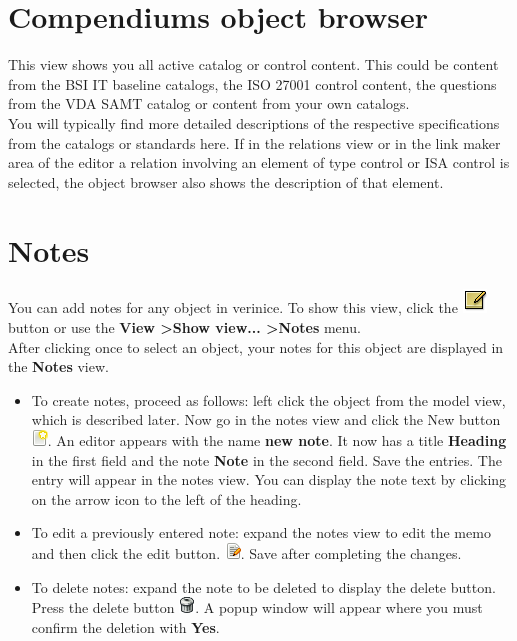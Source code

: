 \documentclass[a4paper,10pt]{book}
\begin{document}
\section{Compendiums object browser}
This view shows you all active catalog or control content. This could be content from the BSI IT
baseline catalogs, the ISO 27001 control content, the questions from the VDA SAMT catalog or content from your own catalogs.
\newline\\
You will typically find more detailed descriptions of the respective specifications from the catalogs or standards here.
If in the relations view or in the link maker area of the editor a relation involving an element of type control or ISA control is selected, the object
browser also shows the description of that element.

\section{Notes}
You can add notes for any object in verinice. To show this view, click the \includegraphics[height=2ex]{Icon/Notizen.png}
button or use the \textbf{View \textgreater Show view... \textgreater Notes} menu.
\newline\\
After clicking once to select an object, your notes for this object are displayed in the \textbf{Notes} view.
\begin{itemize}
 \item To create notes, proceed as follows: left click the object from the model view, which is described later.
Now go in the notes view and click the New button \includegraphics[height=2ex]{Icon/Oeffnen.png}. An editor appears with the name \textbf{new note}.
It now has a title \textbf{Heading} in the first field and the note \textbf{Note} in the second field.
Save the entries. The entry will appear in the notes view. You can display the note text by clicking on the arrow icon to the left of the heading.
\item To edit a previously entered note: expand the notes view to edit the memo and then click the edit button. \includegraphics[height=2ex]{Icon/Edit.png}.
Save after completing the changes.
\item To delete notes: expand the note to be deleted to display the delete button.
Press the delete button \includegraphics[height=2ex]{Icon/Delete.png}.
A popup window will appear where you must confirm the deletion with \textbf{Yes}.
\end{itemize}
\end{document}
